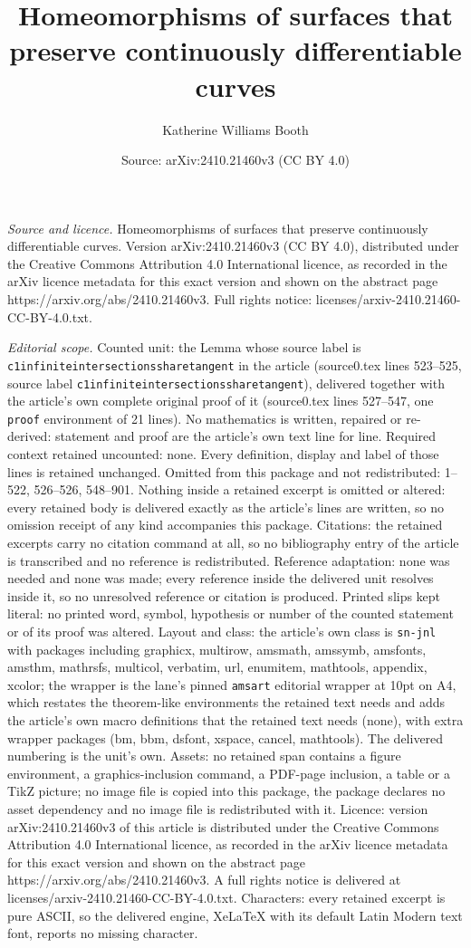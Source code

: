 \documentclass[10pt,a4paper]{amsart}
\title[Homeomorphisms of surfaces that preserve continuously differ]{Homeomorphisms of surfaces that preserve continuously differentiable curves}
\author{Katherine Williams Booth}
\date{Source: arXiv:2410.21460v3 (CC BY 4.0)}
\begin{document}
\maketitle

\noindent\emph{Source and licence.} Homeomorphisms of surfaces that preserve continuously differentiable curves. Version arXiv:2410.21460v3 (CC BY 4.0), distributed under the Creative Commons Attribution 4.0 International licence, as recorded in the arXiv licence metadata for this exact version and shown on the abstract page https://arxiv.org/abs/2410.21460v3. Full rights notice: licenses/arxiv-2410.21460-CC-BY-4.0.txt.\par\smallskip

\noindent\textit{Editorial scope.} Counted unit: the Lemma whose source label is \texttt{c1infiniteintersectionssharetangent} in the article (source0.tex lines 523--525, source label \texttt{c1infiniteintersectionssharetangent}), delivered together with the article's own complete original proof of it (source0.tex lines 527--547, one \texttt{proof} environment of 21 lines). No mathematics is written, repaired or re-derived: statement and proof are the article's own text line for line. Required context retained uncounted: none. Every definition, display and label of those lines is retained unchanged. Omitted from this package and not redistributed: 1--522, 526--526, 548--901. Nothing inside a retained excerpt is omitted or altered: every retained body is delivered exactly as the article's lines are written, so no omission receipt of any kind accompanies this package. Citations: the retained excerpts carry no citation command at all, so no bibliography entry of the article is transcribed and no reference is redistributed. Reference adaptation: none was needed and none was made; every reference inside the delivered unit resolves inside it, so no unresolved reference or citation is produced. Printed slips kept literal: no printed word, symbol, hypothesis or number of the counted statement or of its proof was altered. Layout and class: the article's own class is \texttt{sn-jnl} with packages including graphicx, multirow, amsmath, amssymb, amsfonts, amsthm, mathrsfs, multicol, verbatim, url, enumitem, mathtools, appendix, xcolor; the wrapper is the lane's pinned \texttt{amsart} editorial wrapper at 10pt on A4, which restates the theorem-like environments the retained text needs and adds the article's own macro definitions that the retained text needs (none), with extra wrapper packages (bm, bbm, dsfont, xspace, cancel, mathtools). The delivered numbering is the unit's own. Assets: no retained span contains a figure environment, a graphics-inclusion command, a PDF-page inclusion, a table or a TikZ picture; no image file is copied into this package, the package declares no asset dependency and no image file is redistributed with it. Licence: version arXiv:2410.21460v3 of this article is distributed under the Creative Commons Attribution 4.0 International licence, as recorded in the arXiv licence metadata for this exact version and shown on the abstract page https://arxiv.org/abs/2410.21460v3. A full rights notice is delivered at licenses/arxiv-2410.21460-CC-BY-4.0.txt. Characters: every retained excerpt is pure ASCII, so the delivered engine, XeLaTeX with its default Latin Modern text font, reports no missing character.
\end{document}
